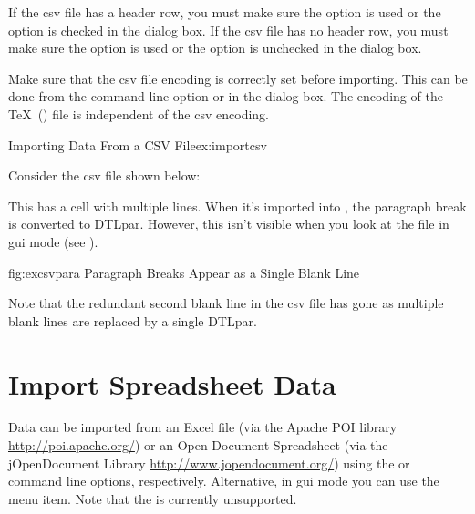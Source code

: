   If the \gls{csv} file has a header row, you must make sure 
   the  option is used or the 
    option is checked in the
    dialog box.
   If the \gls{csv} file has no header row, you must make sure 
   the  option is used or the 
    option is unchecked in the
    dialog box.


   Make sure that the \gls{csv} file encoding is correctly set
   before importing. This can be done from the 
   command line option or in the 
    dialog box. The encoding
   of the \TeX\ () file is independent of the \gls{csv}
   encoding.

\begin{example}{Importing Data From a CSV File}{ex:importcsv}

   Consider the \gls{csv} file shown below:


   This has a cell with multiple lines. When it's imported into
   , the paragraph break is converted to \gls{DTLpar}.
   However, this isn't visible when you look at the file in 
   \gls{gui} mode (see ).

\FloatFig
 {fig:excsvpara}
 {%
 }
 {Paragraph Breaks Appear as a Single Blank Line}

   Note that the redundant second blank line in the \gls{csv} file
   has gone as multiple blank lines are replaced by a single
   \gls{DTLpar}.
\end{example}

\section{Import Spreadsheet Data}\label{sec:importspread}

   Data can be imported from an Excel  file (via the 
   Apache POI library \url{http://poi.apache.org/})
   or an Open Document Spreadsheet (via the jOpenDocument Library
   \url{http://www.jopendocument.org/}) using the
    or  command line options, respectively.
   Alternative, in \gls{gui} mode you can use the 
    menu item.
   Note that the  is currently unsupported.

